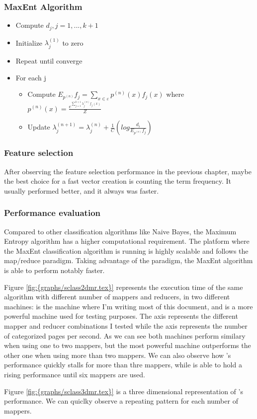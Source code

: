 \subsubsection{MaxEnt Algorithm}


\begin{itemize}
\item Compute $d_j, j=1,...,k+1$
\item Initialize $\lambda_j^{(1)}$ to zero
\item Repeat until converge
\item For each j 
  \begin{itemize}
  \item Compute $E_{p^{(n)}} f_j = \sum\limits_{x \in \varepsilon} p^{(n)} (x)f_j(x)$
    where $p^{(n)}(x) = \frac{e^{\sum\limits_{j=1}^{k+1}\lambda_j^{(n)}f_j(x)}}{Z}$ 
  \item Update $\lambda_j^{(n+1)} = \lambda_j^{(n)} + \frac{1}{C}(log\frac{d_i}{E_{{p^{(n)}}}f_j})$
  \end{itemize}
\end{itemize}

  

\subsubsection{Feature selection}
After observing the feature selection performance in the previous chapter, maybe the best choice for a fast vector creation is counting the term frequency. It usually performed better, and it always
was faster.


\subsubsection{Performance evaluation}
Compared to other classification algorithms like Naive Bayes, the Maximum Entropy algorithm has a higher computational requirement. 
The platform where the MaxEnt classification algorithm is running is highly scalable and follows the map/reduce paradigm. Taking advantage of the paradigm, the MaxEnt algorithm
is able to perform notably faster.



Figure \ref{fig:{graphs/sclass2dmr.tex}} represents the execution time of the same algorithm with different number of mappers and reducers, in two different machines:  
is the machine where I'm writing most of this document, and  is a more powerful machine used for testing purposes. The  axis represents the 
different mapper and reducer combinations I tested while the  axis represents the number of categorized pages per second.
As we can see both machines perform similary when using one to two mappers, but the most powerful machine outperforms the other one when using more than two mappers. We can also observe how 's performance
quickly stalls for more than thre mappers, while  is able to hold a rising performance until six mappers are used.

Figure \ref{fig:{graphs/sclass3dmr.tex}} is a three dimensional representation of 's performance. We can quiclky observe a repeating pattern for each number of mappers.

